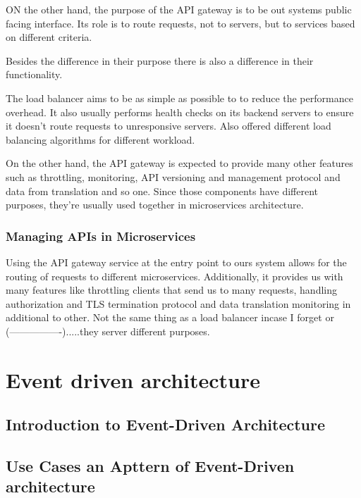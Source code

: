 \documentclass[a4paper, 11pt]{book}
\begin{document}
    ON the other hand, the purpose of the API gateway is to be out systems public facing interface.
    Its role is to route requests, not to servers, but to services based on different criteria.

    Besides the difference in their purpose there is also a difference in their functionality.

    The load balancer aims to be as simple as possible to to reduce the performance overhead.
    It also usually performs health checks on its backend servers to ensure it doesn't route requests to unresponsive servers.
    Also offered different load balancing algorithms for different workload.

    On the other hand, the API gateway is expected to provide many other features such as throttling, monitoring, API versioning and management protocol and data from translation and so one.
    Since those components have different purposes, they're usually used together in microservices architecture.

    \subsubsection{Managing APIs in Microservices}
    Using the API gateway service at the entry point to ours system allows for the routing of requests to different microservices.
    Additionally, it provides us with many features like throttling clients that send us to many requests, handling authorization and TLS termination protocol and data translation monitoring in additional to other.
    Not the same thing as a load balancer incase I forget or (----------------).....they server different purposes.


    \section{Event driven architecture}

    \subsection{Introduction to Event-Driven Architecture}

    \subsection{Use Cases an Apttern of Event-Driven architecture}
\end{document}
